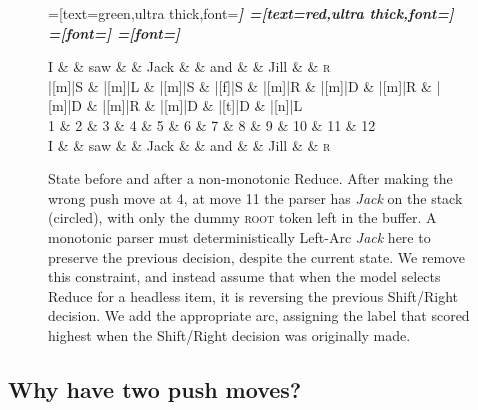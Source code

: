 \documentclass[11pt,letterpaper]{article}
\begin{document}
\begin{figure}
    \centering
    \begin{dependency}[theme=simple]
    =[text=green,ultra thick,font=\bfseries\itshape]
    =[text=red,ultra thick,font=\bfseries\itshape]
    =[font=\bfseries\itshape]
    =[font=\itshape]
    \begin{deptext}[column sep=.075cm, row sep=.1ex]
        I \&           \& saw \&          \& Jack       \& \& and     \&           \& Jill \&   \& \textsc{r} \\
       |[m]|S \& |[m]|L \& |[m]|S   \& |[f]|S \& |[m]|R \& |[m]|D \& |[m]|R \& |[m]|D \& |[m]|R \& |[m]|D \& |[t]|D \& |[n]|L \\
            1 \&     2       \& 3  \&   4      \& 5          \& 6 \& 7     \& 8 \& 9 \& 10 \& 11 \& 12 \\
            I \&           \& saw \&          \& Jack       \& \& and     \&           \& Jill \& \& \textsc{r} \\
\end{deptext}
    
    
\end{dependency}
\caption{
\small
State before and after a non-monotonic Reduce.
After making the wrong push move at 4, at move 11
the parser has \emph{Jack} on the stack (circled), with only the dummy \textsc{root}
token left in the buffer. A monotonic parser must deterministically Left-Arc
\emph{Jack} here to preserve the previous decision, despite the current state.
We remove this constraint, and instead assume that when the model selects Reduce
for a headless item, it is reversing the previous Shift/Right decision. We add
the appropriate arc, assigning the label that scored highest when the Shift/Right
decision was originally made.
\label{fig:adduce}}
\end{figure}


\subsection{Why have two push moves?}
\end{document}

